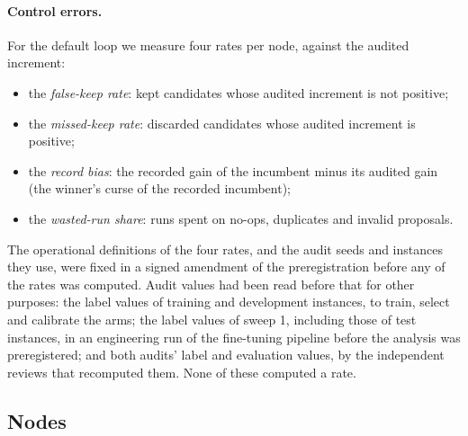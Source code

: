 \paragraph{Control errors.}
For the default loop we measure four rates per node, against the audited increment:
\begin{itemize}
\item the \emph{false-keep rate}: kept candidates whose audited increment is not positive;
\item the \emph{missed-keep rate}: discarded candidates whose audited increment is positive;
\item the \emph{record bias}: the recorded gain of the incumbent minus its audited gain (the winner's curse of the recorded incumbent);
\item the \emph{wasted-run share}: runs spent on no-ops, duplicates and invalid proposals.
\end{itemize}
The operational definitions of the four rates, and the audit seeds and instances they use, were fixed in a signed amendment of the preregistration before any of the rates was computed. Audit values had been read before that for other purposes: the label values of training and development instances, to train, select and calibrate the arms; the label values of sweep 1, including those of test instances, in an engineering run of the fine-tuning pipeline before the analysis was preregistered; and both audits' label and evaluation values, by the independent reviews that recomputed them. None of these computed a rate. 

\subsection{Nodes}
\label{app:nodes}

